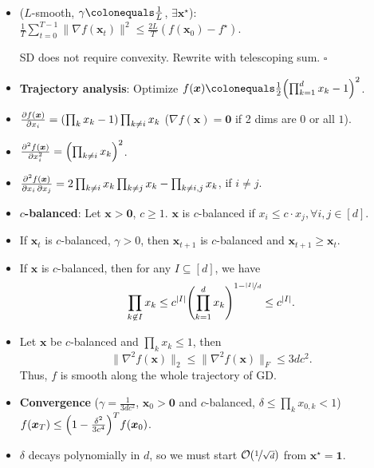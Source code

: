 \documentclass[8pt,a4paper]{extarticle}
\renewcommand{\proof}[1]{\begin{tcolorbox}#1 \hfill $\square$\end{tcolorbox}}
\newcommand{\lft}{\mathopen{}\mathclose\bgroup\left}
\newcommand{\rgt}{\aftergroup\egroup\right}
\renewcommand{\vec}[1]{\bm{#1}}
\newenvironment{topic}[1]
{\textbf{\sffamily \colorbox{black}{\rlap{\textbf{\textcolor{white}{#1}}}\hspace{\linewidth}\hspace{-2\fboxsep}}} \\ \vspace{0.2cm}}
{}
\begin{document}
\begin{multicols*}{2}
    \begin{topic}{Nonconvex functions}
        \begin{itemize}
            \item ($L$-smooth, $\gamma \colonequals \frac{1}{L}$, $\exists \vec{x}^\star$): $\frac{1}{T} \sum_{t=0}^{T-1} \| \nabla f(\vec{x}_t) \|^2 \leq \frac{2L}{T} (f(\vec{x}_0) - f^\star)$.
                  \proof{SD does not require convexity. Rewrite with telescoping sum.}
            \item \textbf{Trajectory analysis}: Optimize $f(\vec{x}) \colonequals \frac{1}{2} \lft( \prod_{k=1}^d x_k - 1 \rgt)^2$.
            \item $\pdv{f(\vec{x})}{x_i} = \lft( \prod_k x_k - 1 \rgt) \prod_{k\neq i} x_k$ ($\nabla f(\vec{x})=\vec{0}$ if 2 dims are $0$ or all $1$).
            \item $\pdv[order=2]{f(\vec{x})}{x_i} = \lft( \prod_{k\neq i} x_k \rgt)^2$.
            \item $\pdv{f(\vec{x})}{x_i,x_j} = 2 \prod_{k\neq i} x_k \prod_{k \neq j} x_k - \prod_{k\neq i,j} x_k$, if $i \neq j$.
            \item \textbf{$c$-balanced}: Let $\vec{x} > \vec{0}$, $c \geq 1$. $\vec{x}$ is $c$-balanced if $x_i \leq c \cdot x_j, \forall i, j \in [d]$.
            \item If $\vec{x}_t$ is $c$-balanced, $\gamma > 0$, then $\vec{x}_{t+1}$ is $c$-balanced and
                  $\vec{x}_{t+1} \geq \vec{x}_t$.
            \item If $\vec{x}$ is $c$-balanced, then for any $I \subseteq [d]$, we have \[
                      \prod_{k \not\in I} x_k \leq c^{|I|} \lft( \prod_{k=1}^d x_k \rgt)^{1 - \nicefrac{|I|}{d}} \leq c^{|I|}.
                  \]
            \item Let $\vec{x}$ be $c$-balanced and $\prod_k x_k \leq 1$, then \[
                      \| \nabla^2 f(\vec{x}) \|_2 \leq \| \nabla^2 f(\vec{x}) \|_F \leq 3dc^2.
                  \]
                  Thus, $f$ is smooth along the whole trajectory of GD.
            \item \textbf{Convergence} ($\gamma = \frac{1}{3dc^2}$, $\vec{x}_0 > \vec{0}$ and $c$-balanced, $\delta \leq \prod_k x_{0,k} < 1$) \\ $f(\vec{x}_T) \leq \lft( 1 - \frac{\delta^2}{3c^4} \rgt)^T f(\vec{x}_0)$.
            \item $\delta$ decays polynomially in $d$, so we must start $\mathcal{O}(\nicefrac{1}{\sqrt{d}})$ from $\vec{x}^\star = \vec{1}$.
        \end{itemize}
    \end{topic}


\end{multicols*}
\end{document}
